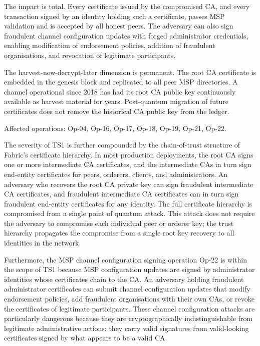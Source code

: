 \documentclass[conference]{IEEEtran}
\begin{document}
The impact is total. Every certificate issued by the compromised CA, and
every transaction signed by an identity holding such a certificate, passes
MSP validation and is accepted by all honest peers. The adversary can also
sign fraudulent channel configuration updates with forged administrator
credentials, enabling modification of endorsement policies, addition of
fraudulent organisations, and revocation of legitimate participants.

The harvest-now-decrypt-later dimension is permanent. The root CA
certificate is embedded in the genesis block and replicated to all peer
MSP directories. A channel operational since 2018 has had its root CA
public key continuously available as harvest material for years. Post-quantum
migration of future certificates does not remove the historical CA public
key from the ledger.

Affected operations: Op-04, Op-16, Op-17, Op-18, Op-19, Op-21, Op-22.

The severity of TS1 is further compounded by the chain-of-trust structure
of Fabric's certificate hierarchy. In most production deployments, the
root CA signs one or more intermediate CA certificates, and the intermediate
CAs in turn sign end-entity certificates for peers, orderers, clients, and
administrators. An adversary who recovers the root CA private key can sign
fraudulent intermediate CA certificates, and fraudulent intermediate CA
certificates can in turn sign fraudulent end-entity certificates for any
identity. The full certificate hierarchy is compromised from a single
point of quantum attack. This attack does not require the adversary to
compromise each individual peer or orderer key; the trust hierarchy
propagates the compromise from a single root key recovery to all
identities in the network.

Furthermore, the MSP channel configuration signing operation Op-22 is
within the scope of TS1 because MSP configuration updates are signed by
administrator identities whose certificates chain to the CA. An adversary
holding fraudulent administrator certificates can submit channel
configuration updates that modify endorsement policies, add fraudulent
organisations with their own CAs, or revoke the certificates of legitimate
participants. These channel configuration attacks are particularly
dangerous because they are cryptographically indistinguishable from
legitimate administrative actions: they carry valid signatures from
valid-looking certificates signed by what appears to be a valid CA.
\end{document}
